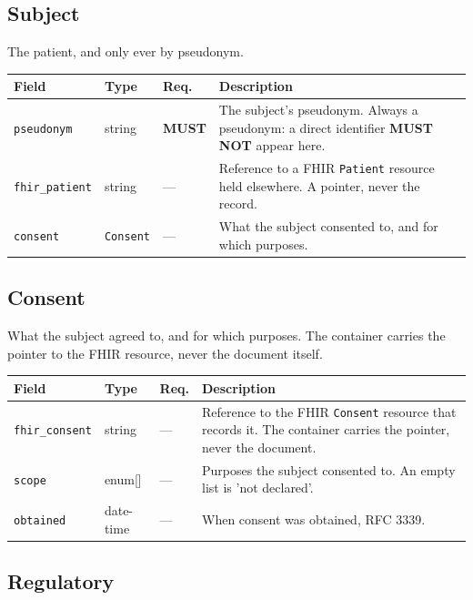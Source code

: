 \documentclass[11pt,a4paper]{article}
\newcommand{\MUST}{\textcolor{uosred}{\textbf{MUST}}}
\newcommand{\MUSTNOT}{\textcolor{uosred}{\textbf{MUST NOT}}}
\newcommand{\code}[1]{\texttt{\small #1}}
\begin{document}
\subsection{Subject}

The patient, and only ever by pseudonym.

\begin{longtable}{L{3.5cm} L{3.0cm} C{1.4cm} L{6.4cm}}
\toprule
\textbf{Field} & \textbf{Type} & \textbf{Req.} & \textbf{Description}\\
\midrule
\endhead
\code{pseudonym} & string & \MUST{} & The subject's pseudonym. Always a pseudonym: a direct identifier \MUSTNOT{} appear here.\\
\code{fhir\_patient} & string & --- & Reference to a FHIR \code{Patient} resource held elsewhere. A pointer, never the record.\\
\code{consent} & \code{Consent} & --- & What the subject consented to, and for which purposes.\\
\bottomrule
\end{longtable}

\subsection{Consent}

What the subject agreed to, and for which purposes. The container carries the pointer to the FHIR resource, never the document itself.

\begin{longtable}{L{3.5cm} L{3.0cm} C{1.4cm} L{6.4cm}}
\toprule
\textbf{Field} & \textbf{Type} & \textbf{Req.} & \textbf{Description}\\
\midrule
\endhead
\code{fhir\_consent} & string & --- & Reference to the FHIR \code{Consent} resource that records it. The container carries the pointer, never the document.\\
\code{scope} & enum[] & --- & Purposes the subject consented to. An empty list is 'not declared'.\\
\code{obtained} & date-time & --- & When consent was obtained, RFC 3339.\\
\bottomrule
\end{longtable}

\subsection{Regulatory}
\end{document}
